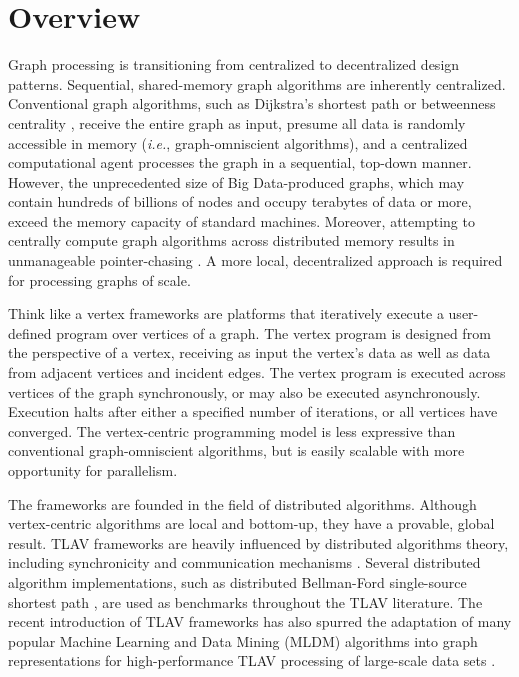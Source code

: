 \documentclass[reprint,twocolumn,showpacs,preprintnumbers,amsmath, aps,pre,amssymb]{revtex4-1}
\begin{document}
\section{Overview}
\label{sec:overview}

Graph processing is transitioning from centralized to decentralized design patterns.  Sequential, shared-memory graph algorithms are inherently centralized.  Conventional graph algorithms, such as Dijkstra's shortest path \cite{Dijkstra1971} or betweenness centrality \cite{Freeman1977}, receive the entire graph as input, presume all data is randomly accessible in memory ({\em i.e.}, graph-omniscient algorithms), and a centralized computational agent processes the graph in a sequential, top-down manner.  However, the unprecedented size of Big Data-produced graphs, which may contain hundreds of billions of nodes and occupy terabytes of data or more, exceed the memory capacity of standard machines.  Moreover, attempting to centrally compute graph algorithms across distributed memory results in unmanageable pointer-chasing \cite{Lumsdaine2007}.  A more local, decentralized approach is required for processing graphs of scale.

Think like a vertex frameworks are platforms that iteratively execute a user-defined program over vertices of a graph. The vertex program is designed from the perspective of a vertex, receiving as input the vertex's data as well as data from adjacent vertices and incident edges.  The vertex program is executed across vertices of the graph synchronously, or may also be executed asynchronously.  Execution halts after either a specified number of iterations, or all vertices have converged.  The vertex-centric programming model is less expressive than conventional graph-omniscient algorithms, but is easily scalable with more opportunity for parallelism. 

The frameworks are founded in the field of distributed algorithms. Although vertex-centric algorithms are local and bottom-up, they have a provable, global result.  TLAV frameworks are heavily influenced by distributed algorithms theory, including synchronicity and communication mechanisms \cite{Lynch1996}.  Several distributed algorithm implementations, such as distributed Bellman-Ford single-source shortest path \cite{Lynch1996}, are used as benchmarks throughout the TLAV literature.  The recent introduction of TLAV frameworks has also spurred the adaptation of many popular Machine Learning and Data Mining (MLDM) algorithms into graph representations for high-performance TLAV processing of large-scale data sets \cite{Low2010}.
\end{document}
